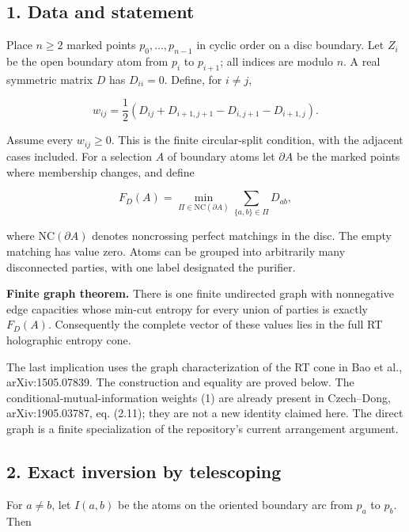 \documentclass[11pt]{article}
\begin{document}
\subsection{1. Data and statement}\label{data-and-statement}

Place \(n\geq2\) marked points \(p_0,\ldots,p_{n-1}\) in cyclic order on
a disc boundary. Let \(Z_i\) be the open boundary atom from \(p_i\) to
\(p_{i+1}\); all indices are modulo \(n\). A real symmetric matrix \(D\)
has \(D_{ii}=0\). Define, for \(i\ne j\),

\[
w_{ij}=\frac12\left(
D_{ij}+D_{i+1,j+1}-D_{i,j+1}-D_{i+1,j}
\right).                                                     \tag{1}
\]

Assume every \(w_{ij}\geq0\). This is the finite circular-split
condition, with the adjacent cases included. For a selection \(A\) of
boundary atoms let \(\partial A\) be the marked points where membership
changes, and define

\[
F_D(A)=\min_{\Pi\in\mathrm{NC}(\partial A)}
       \sum_{\{a,b\}\in\Pi}D_{ab},                          \tag{2}
\]

where \(\mathrm{NC}(\partial A)\) denotes noncrossing perfect matchings
in the disc. The empty matching has value zero. Atoms can be grouped
into arbitrarily many disconnected parties, with one label designated
the purifier.

\textbf{Finite graph theorem.} There is one finite undirected graph with
nonnegative edge capacities whose min-cut entropy for every union of
parties is exactly \(F_D(A)\). Consequently the complete vector of these
values lies in the full RT holographic entropy cone.

The last implication uses the graph characterization of the RT cone in
Bao et al., arXiv:1505.07839. The construction and equality are proved
below. The conditional-mutual-information weights (1) are already
present in Czech--Dong, arXiv:1905.03787, eq. (2.11); they are not a new
identity claimed here. The direct graph is a finite specialization of
the repository's current arrangement argument.

\subsection{2. Exact inversion by
telescoping}\label{exact-inversion-by-telescoping}

For \(a\ne b\), let \(I(a,b)\) be the atoms on the oriented boundary arc
from \(p_a\) to \(p_b\). Then
\end{document}
